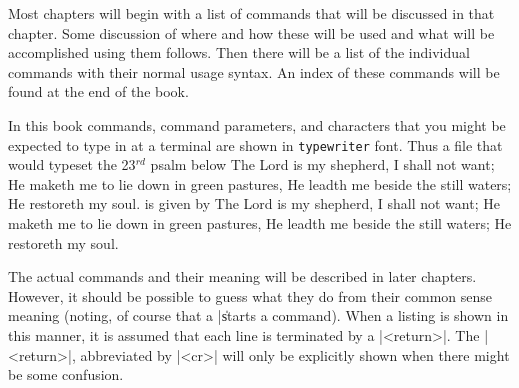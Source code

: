 Most chapters will begin with a list of commands that will be discussed in that
chapter. Some discussion of where and how these will be used and what will be
accomplished using them follows. Then there will be a list of the individual
commands with their normal usage syntax. An index of these commands will be
found at the end of the book.

\ejectpage
{}
\def\cqu{\cquote{We ought to give the whole of our attention to
the most insignificant and most easily mastered facts, and remain a long time
in contemplation of them until we are accustomed to behold the truth clearly
and distinctly}{Rules for the Direction of the Mind, Rule IX, 
Ren\'e~Descartes (1596-1650)}}

In this book commands, command parameters, and characters that you might be
expected to type in at a terminal are shown in {\tt typewriter} font. Thus a
file that would typeset the  23$^{rd}$ psalm below
\medskip
\beginnarrowtext 1in
\eightpoint
\obeylines
The Lord is my shepherd, I shall not want;
He maketh me to lie down in green pastures,
He leadth me beside the still waters;
He restoreth my soul.
\endnarrowtext
\noindent
is given  by 
\begintt
\beginnarrowtext 1in
\eightpoint
\obeylines
The Lord is my shepherd, I shall not want;
He maketh me to lie down in green pastures,
He leadth me beside the still waters;
He restoreth my soul.
\endnarrowtext
\bye
\endtt

The actual commands and their meaning will be described in later chapters. 
However, it should be possible to guess what they do from their common sense
meaning (noting, of course that a |\| starts a command). 
When a listing is shown in this manner, it is assumed that each line
is terminated by a |<return>|. The |<return>|, abbreviated by |<cr>| will
only be explicitly shown when there might be some confusion.

